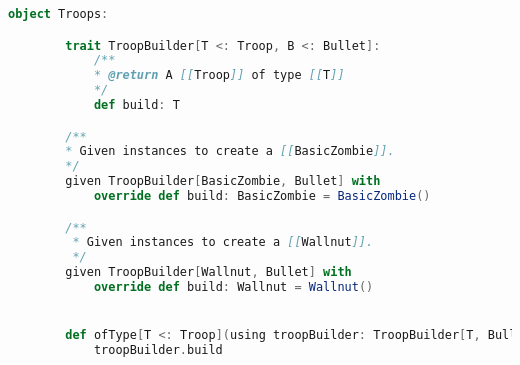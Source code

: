\begin{lstlisting}[language=Scala, label=code:troopbuilder, caption= Builder per la creazione di una Troop.]
    object Troops:

        trait TroopBuilder[T <: Troop, B <: Bullet]:
            /**
            * @return A [[Troop]] of type [[T]]
            */
            def build: T

        /**
        * Given instances to create a [[BasicZombie]].
        */
        given TroopBuilder[BasicZombie, Bullet] with
            override def build: BasicZombie = BasicZombie()

        /**
         * Given instances to create a [[Wallnut]].
         */
        given TroopBuilder[Wallnut, Bullet] with
            override def build: Wallnut = Wallnut()


        def ofType[T <: Troop](using troopBuilder: TroopBuilder[T, Bullet]): T =
            troopBuilder.build
\end{lstlisting}